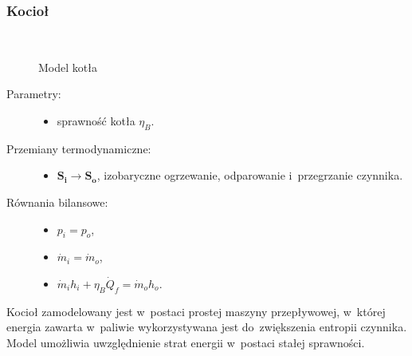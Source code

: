 \subsubsection{Kocioł}

\begin{figure}[H]
	\centering

	~ %

	\caption{Model kotła}
	\label{elem:kociol}
\end{figure}

\begin{description}

	\item[Parametry:] \hfill

		\begin{itemize}

			\item sprawność kotła $\eta_B$.

		\end{itemize}

	\item[Przemiany termodynamiczne:] \hfill

		\begin{itemize}

			\item $\mathbf{S_i} \rightarrow \mathbf{S_o}$,
				izobaryczne ogrzewanie, odparowanie i~przegrzanie
				czynnika.

		\end{itemize}

	\item[Równania bilansowe:] \hfill

		\begin{itemize}

			\item \eq$p_i = p_o$,

			\item \eq$\dot m_i = \dot m_o$,

			\item \eq$\dot m_i h_i + \eta_B \dot Q_f = \dot m_o h_o$.

		\end{itemize}

\end{description}

Kocioł zamodelowany jest w~postaci prostej maszyny przepływowej,
w~której energia zawarta w~paliwie wykorzystywana jest do~zwiększenia
entropii czynnika. Model umożliwia uwzględnienie strat energii w~postaci
stałej sprawności.

